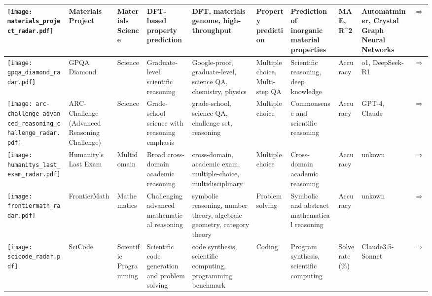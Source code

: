 \begin{landscape}
{\begin{longtable}{|p{}|p{}|p{}|p{}|p{}|p{}|p{}|p{}|p{}|p{}|}
\texttt{[image: materials\_project\_radar.pdf]} & Materials Project & Materials Science & DFT-based property prediction & DFT, materials genome, high-throughput & Property prediction & Prediction of inorganic material properties & MAE, R{\textasciicircum}2 & Automatminer, Crystal Graph Neural Networks & \cite{jain2013materials}\href{https://materialsproject.org/}{$\Rightarrow$} \\ \hline
\texttt{[image: gpqa\_diamond\_radar.pdf]} & GPQA Diamond & Science & Graduate-level scientific reasoning & Google-proof, graduate-level, science QA, chemistry, physics & Multiple choice, Multi-step QA & Scientific reasoning, deep knowledge & Accuracy & o1, DeepSeek-R1 & \cite{rein2023gpqagraduatelevelgoogleproofqa}\href{https://arxiv.org/abs/2311.12022}{$\Rightarrow$} \\ \hline
\texttt{[image: arc-challenge\_advanced\_reasoning\_challenge\_radar.pdf]} & ARC-Challenge (Advanced Reasoning Challenge) & Science & Grade-school science with reasoning emphasis & grade-school, science QA, challenge set, reasoning & Multiple choice & Commonsense and scientific reasoning & Accuracy & GPT-4, Claude & \cite{clark2018think}\href{https://allenai.org/data/arc}{$\Rightarrow$} \\ \hline
\texttt{[image: humanitys\_last\_exam\_radar.pdf]} & Humanity's Last Exam & Multidomain & Broad cross-domain academic reasoning & cross-domain, academic exam, multiple-choice, multidisciplinary & Multiple choice & Cross-domain academic reasoning & Accuracy & unkown & \cite{phan2025humanitysexam}\href{https://arxiv.org/abs/2501.14249}{$\Rightarrow$} \\ \hline
\texttt{[image: frontiermath\_radar.pdf]} & FrontierMath & Mathematics & Challenging advanced mathematical reasoning & symbolic reasoning, number theory, algebraic geometry, category theory & Problem solving & Symbolic and abstract mathematical reasoning & Accuracy & unkown & \cite{glazer2024frontiermathbenchmarkevaluatingadvanced}\href{https://arxiv.org/abs/2411.04872}{$\Rightarrow$} \\ \hline
\texttt{[image: scicode\_radar.pdf]} & SciCode & Scientific Programming & Scientific code generation and problem solving & code synthesis, scientific computing, programming benchmark & Coding & Program synthesis, scientific computing & Solve rate (\%) & Claude3.5-Sonnet & \cite{tian2024scicoderesearchcodingbenchmark}\href{https://arxiv.org/abs/2407.13168}{$\Rightarrow$} \\ \hline

\end{longtable}}
\end{landscape}
